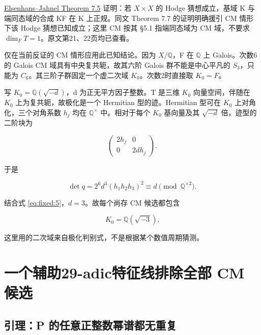 \documentclass[11pt,a4paper,oneside]{ctexrep}
\theoremstyle{cnplain}
\theoremstyle{definition}
\theoremstyle{remark}
\begin{document}
\href{https://wwwuser.gwdguser.de/~jjahnel/Arbeiten/Komponentengruppe_v4f.pdf}{Elsenhans--Jahnel Theorem 7.5} 证明：若 \(X\times X\) 的 Hodge 猜想成立，基域 K 与端同态域的合成 KF 在 K 上正规。同文 Theorem 7.7 的证明明确援引 CM 情形下该 Hodge 猜想已知成立；这里 CM 按其 §5.1 指端同态域为 CM 域，不要求 \(\dim_FT=1\)。原文第21、22页均已查看。

仅在当前反证的 CM 情形应用此已知结论。因为 \(X/\mathbb Q\)，F 在 \(\mathbb Q\) 上 Galois。次数6的 Galois CM 域具有中央复共轭，故其六阶 Galois 群不能是中心平凡的 \(S_3\)，只能为 \(C_6\)。其三阶子群固定一个虚二次域 \(K_0\)。次数2时直接取 \(K_0=F\)。

写 \(K_0=\mathbb Q(\sqrt{-d})\)，d 为正无平方因子整数。T 是三维 \(K_0\) 向量空间，伴随在 \(K_0\) 上为复共轭，故极化是一个 Hermitian 型的迹。Hermitian 型可在 \(K_0\) 上对角化，三个对角系数 \(h_j\) 均在 \(\mathbb Q^\times\) 中。相对于每个 \(K_0\) 基向量及其 \(\sqrt{-d}\) 倍，迹型的二阶块为

\begin{equation}
\begin{pmatrix}2h_j&0\\0&2dh_j\end{pmatrix}.
\end{equation}

于是

\begin{equation}
\det q=2^6d^3(h_1h_2h_3)^2\equiv d
          \pmod{\mathbb Q^{\times2}}.
\end{equation}

结合式 \eqref{eq:fixed:5}，\(d=3\)。故每个尚存 CM 候选都包含

\begin{equation}
K_0=\mathbb Q(\sqrt{-3}).              \label{eq:fixed:6}
\end{equation}

这里用的二次域来自极化判别式，不是根据某个数值周期猜测。

\section{一个辅助29-adic特征线排除全部 CM 候选}\label{sec:fixed:4}

\subsection{引理：P 的任意正整数幂谱都无重复}\label{ux5f15ux7406p-ux7684ux4efbux610fux6b63ux6574ux6570ux5e42ux8c31ux90fdux65e0ux91cdux590d}
\end{document}
